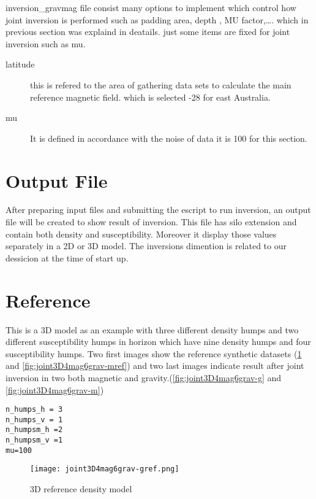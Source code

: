inversion_gravmag file consist many options to implement which control how joint inversion is performed such as padding area, depth , MU factor,\ldots. which in previous section was explaind in deatails. just some items are fixed for joint inversion such as mu.


\begin{description} 	
\item[latitude]this is refered to the area of gathering data sets to calculate the main reference magnetic field. which is selected -28 for east Australia.


\item[mu]It is defined in accordance with the noise of data it is 100 for this section.

\end{description}

\section{Output File}

After preparing input files and submitting the escript to run inversion, an output file will be created to show result of inversion. This file has silo extension and contain both density and susceptibility. Moreover it display those values separately in a 2D or 3D model. The inversions dimention is related to our dessicion at the time of start up.

\section{Reference}

This is a 3D model as an example with three different density humps and two different susceptibility humps in horizon which have nine density humps and four susceptibility humps. Two first images show the reference synthetic datasets (\ref{fig:joint3D4mag6grav-gref} and \ref{fig:joint3D4mag6grav-mref}) and two last images indicate result after joint inversion in two both magnetic and gravity.(\ref{fig:joint3D4mag6grav-g} and \ref{fig:joint3D4mag6grav-m})
 
\begin{verbatim}
n_humps_h = 3
n_humps_v = 1
n_humpsm_h =2
n_humpsm_v =1
mu=100
\end{verbatim}

\begin{figure}
\centering
\texttt{[image: joint3D4mag6grav-gref.png]}
\caption{3D reference density model}
\label{fig:joint3D4mag6grav-gref}
\end{figure}


